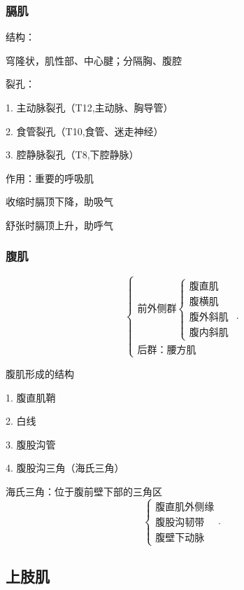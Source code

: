 \subsubsection{膈肌}%
\label{subsub:膈肌}
结构：

穹隆状，肌性部、中心腱；分隔胸、腹腔

裂孔：

1. 主动脉裂孔（T12,主动脉、胸导管）

2. 食管裂孔（T10,食管、迷走神经）

3. 腔静脉裂孔（T8,下腔静脉）

作用：重要的呼吸肌

收缩时膈顶下降，助吸气

舒张时膈顶上升，助呼气
\subsubsection{腹肌}%
\label{subsub:腹肌}
\[
    \begin{cases}
        \text{前外侧群}\begin{cases}
            \text{腹直肌}\\
            \text{腹横肌}\\
            \text{腹外斜肌}\\
            \text{腹内斜肌}
        \end{cases}\\
        \text{后群：腰方肌}
    \end{cases}
.\] 
\begin{notation}
    腹肌形成的结构

    1. 腹直肌鞘

    2. 白线

    3. 腹股沟管

    4. 腹股沟三角（海氏三角）
\end{notation}
\begin{notation}
    海氏三角：位于腹前壁下部的三角区
    \[
        \begin{cases}
            \text{腹直肌外侧缘}\\
            \text{腹股沟韧带}\\
            \text{腹壁下动脉}
        \end{cases}
    .\] 
\end{notation}
\subsection{上肢肌}%
\label{sub:上肢肌}
